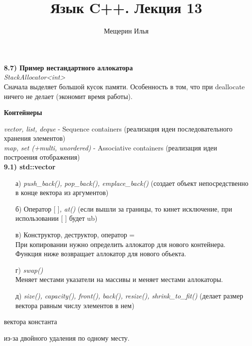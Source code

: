 \documentclass{article}
\title{Язык C++. Лекция 13}
\author{Мещерин Илья}
\date{\DTMdate{2018-12-10}}
\begin{document}
\maketitle

\textbf{8.7) Пример нестандартного аллокатора} \\
\textit{StackAllocator<int>} \\
Сначала выделяет большой кусок памяти. Особенность в том, что при deallocate ничего не делает (экономит время работы). 

\begin{center}
	\begin{large}
		\textbf{Контейнеры}
	\end{large}
\end{center}


\noindent \textit{vector, list, deque} - Sequence containers (реализация идеи последовательного хранения элементов)\\
\textit{map, set (+multi, unordered)} - Associative containers (реализация идеи построения отображения)\\
\textbf{9.1) std::vector}
\begin{itemize}

	\item[а)] 
\textit{push\_back(), pop\_back(), emplace\_back()} (создает объект непосредственно в конце вектора из аргументов)\\
	
	\item[б)] Оператор {[ ]}\textit{, at()} (если вышли за границы, то кинет исключение, при использовании [ ] будет ub)

	\item[в)] Конструктор, деструктор, оператор =\\
При копировании нужно определить аллокатор для нового контейнера. Функция ниже возвращает аллокатор для нового объекта.

	\item[г)] \textit{swap()}\\
Меняет местами указатели на массивы и меняет местами аллокаторы.
	\item[д)] \textit{size(), capacity(), front(), back(), resize(), shrink\_to\_fit()} (делает размер вектора равным числу элементов в нем)
\end{itemize}

 вектора константа


 из-за двойного удаления по одному месту.

\end{document}

